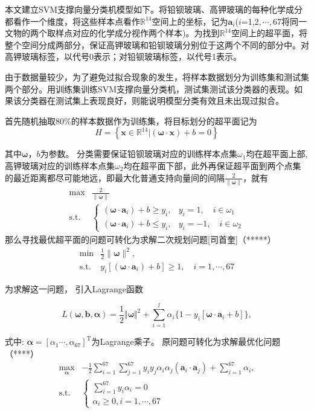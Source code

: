 \documentclass[withoutpreface,bwprint]{cumcmthesis}
\newcommand{\R}{\mathbb{R}}
\begin{document}
本文建立SVM支撑向量分类机模型如下。将铅钡玻璃、高钾玻璃的每种化学成分都看作一个维度，将这些样本点看作$\R^{14}$空间上的坐标，记为$\bm{a}_i$($i$=1,2$,\cdots,67$将同一文物的两个取样点对应的化学成分视作两个样本)。为找到$\R^{14}$空间上的超平面，将整个空间分成两部分，保证高钾玻璃和铅钡玻璃分别位于这两个不同的部分中。对高钾玻璃标签，以代号0表示；对铅钡玻璃标签，以代号1表示。

由于数据量较少，为了避免过拟合现象的发生，将样本数据划分为训练集和测试集两个部分。用训练集训练SVM支撑向量分类机，测试集测试该分类器的表现。如果该分类器在测试集上表现良好，则能说明模型分类有效且未出现过拟合。

首先随机抽取80\%的样本数据作为训练集，将目标划分的超平面记为
$$H=\left\{ \bm{x}\in \mathbb{R}^{14}| (\bm{\omega} \cdot \bm{x})+b=0\right\}$$

其中$\bm{\omega}$，$b$为参数。
分类需要保证铅钡玻璃对应的训练样本点集$\omega_{1}$均在超平面上部, 高钾玻璃对应的训练样本点集$\omega_{2}$均在超平面下部，此外再保证超平面到两个点集的最近距离都尽可能地远，即最大化普通支持向量间的间隔$\frac{2}{\left\| \bm{\omega } \right\|}$，就有
\begin{equation*}
  \begin{array}{ll}
	  \max & \frac{2}{\|\bm{\omega}\|} \\
	  \mathrm{s.t.} & \begin{cases}
	  (\bm{\omega}\cdot\bm{a}_i)+b\geqslant y_i, & y_i=1,\quad i\in \omega_1\\
	  (\bm{\omega}\cdot \bm{a}_i)+b\leqslant y_i,&y_i=-1,\quad i\in\omega_2\end{cases}
  \end{array}
\end{equation*}
那么寻找最优超平面的问题可转化为求解二次规划问题[司首奎]（*****）
\begin{equation*}
  \begin{array}{ll}
	  \min & \frac{1}{2}\|\bm{\omega}\|^2, \\
	  \mathrm{s.t.} & y_i[(\bm{\omega}\cdot\bm{a}_i)+b]\geqslant 1,\quad i=1,\cdots,67
  \end{array}
\end{equation*}

为求解这一问题，
引入Lagrange函数

$$L(\bm{\omega,b,\bm{\alpha}})=\frac{1}{2}\Vert \bm{\omega}\Vert^2+\sum_{i=1}^l\alpha_i\{1-y_i[\bm{\omega}\cdot \bm{a}_i+b]\},$$

式中: $ \boldsymbol{\alpha}=\left[\alpha_{1} \cdots, \alpha_{67}\right]^{\mathrm{T}}$为Lagrange乘子。
原问题可转化为求解最优化问题（****）
\begin{equation*}
\begin{array}{ll}
	\max_{\bm{\alpha}} & -\frac{1}{2}\sum_{i=1}^{67}\sum_{j=1}^{67}y_iy_j\alpha_i\alpha_j(\bm{a}_i\cdot\bm{a}_j)+\sum_{i=1}^{67}\alpha_i, \\
	\mathrm{s.t.} & \begin{cases}
		\sum_{i=1}^{67}y_i\alpha_i=0\\
		\alpha_i\geqslant 0,i=1,\cdots,67
		\end{cases}
\end{array}
\end{equation*}
\end{document}
